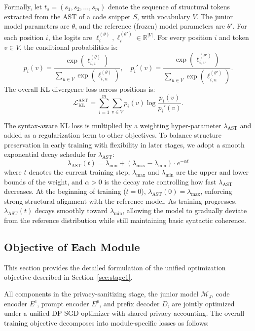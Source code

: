 \documentclass{article}
\theoremstyle{plain}
\theoremstyle{definition}
\theoremstyle{remark}
\begin{document}
{Formally, let $t_s=(s_1,s_2,\dots,s_m)$ denote the sequence of structural tokens extracted from the AST of a code snippet $S$, with vocabulary $V$. The junior model parameters are $\theta$, and the reference (frozen) model parameters are $\theta'$. For each position $i$, the logits are $\ell_i^{(\theta)}, \ell_i^{(\theta')}\in\mathbb{R}^{|V|}$.
For every position $i$ and token $v\in V$, the conditional probabilities is:
$$
p_i(v)=\frac{\exp(\ell_{i,v}^{(\theta)})}{\sum_{u\in V}\exp(\ell_{i,u}^{(\theta)})},\quad
p_i'(v)=\frac{\exp(\ell_{i,v}^{(\theta')})}{\sum_{u\in V}\exp(\ell_{i,u}^{(\theta')})}.
$$
The overall KL divergence loss across positions is:
$$
\mathcal{L}_{\text{KL}}^{\text{AST}}=\sum_{i=1}^{m}\sum_{v\in V}p_i(v)\log\frac{p_i(v)}{p_i'(v)}.
$$

The syntax-aware KL loss is multiplied by a weighting hyper-parameter $\lambda_{\text{AST}}$ and added as a regularization term to other objectives. To balance structure preservation in early training with flexibility in later stages, we adopt a smooth exponential decay schedule for $\lambda_{\text{AST}}$:
$$
\lambda_{\text{AST}}(t) = \lambda_{\min} + (\lambda_{\max} - \lambda_{\min}) \cdot e^{-\alpha t}
$$
where $t$ denotes the current training step, $\lambda_{\max}$ and $\lambda_{\min}$ are the upper and lower bounds of the weight, and $\alpha > 0$ is the decay rate controlling how fast $\lambda_{\text{AST}}$ decreases. At the beginning of training ($t=0$), $\lambda_{\text{AST}}(0) = \lambda_{\max}$, enforcing strong structural alignment with the reference model. As training progresses, $\lambda_{\text{AST}}(t)$ decays smoothly toward $\lambda_{\min}$, allowing the model to gradually deviate from the reference distribution while still maintaining basic syntactic coherence.

\subsection{Objective of Each Module}
\label{app:objectives_detail}

This section provides the detailed formulation of the unified optimization objective described in Section~\ref{sec:stage1}.

All components in the privacy-sanitizing stage, the junior model $\mathcal{M}_J$, code encoder $E^c$, prompt encoder $E^p$, and prefix decoder $D$, are jointly optimized under a unified DP-SGD optimizer with shared privacy accounting. The overall training objective decomposes into module-specific losses as follows:

}
\end{document}
